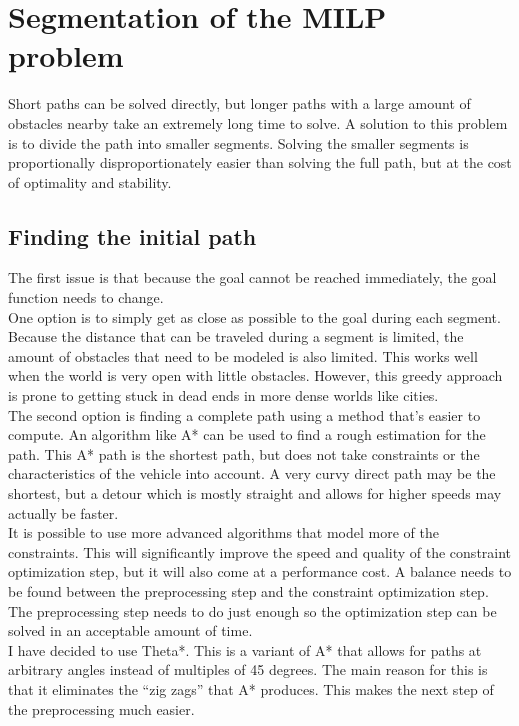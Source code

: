 \section{Segmentation of the MILP problem}
\label{section:segment}
Short paths can be solved directly, but longer paths with a large amount of obstacles nearby take an extremely long time to solve. A solution to this problem is to divide the path into smaller segments. Solving the smaller segments is proportionally disproportionately easier than solving the full path, but at the cost of optimality and stability.
\\
\subsection{Finding the initial path}
The first issue is that because the goal cannot be reached immediately, the goal function needs to change.  \\
One option is to simply get as close as possible to the goal during each segment. Because the distance that can be traveled during a segment is limited, the amount of obstacles that need to be modeled is also limited. This works well when the world is very open with little obstacles. However, this greedy approach is prone to getting stuck in dead ends in more dense worlds like cities.
\\
The second option is finding a complete path using a method that's easier to compute. An algorithm like A* can be used to find a rough estimation for the path. This A* path is the shortest path, but does not take constraints or the characteristics of the vehicle into account. A very curvy direct path may be the shortest, but a detour which is mostly straight and allows for higher speeds may actually be faster. 
\\
It is possible to use more advanced algorithms that model more of the constraints. This will significantly improve the speed and quality of the constraint optimization step, but it will also come at a performance cost. A balance needs to be found between the preprocessing step and the constraint optimization step. The preprocessing step needs to do just enough so the optimization step can be solved in an acceptable amount of time. 
\\
I have decided to use Theta*. This is a variant  of A* that allows for paths at arbitrary angles instead of multiples of 45 degrees. The main reason for this is that it eliminates the ``zig zags'' that A* produces. This makes the next step of the preprocessing much easier.\\
